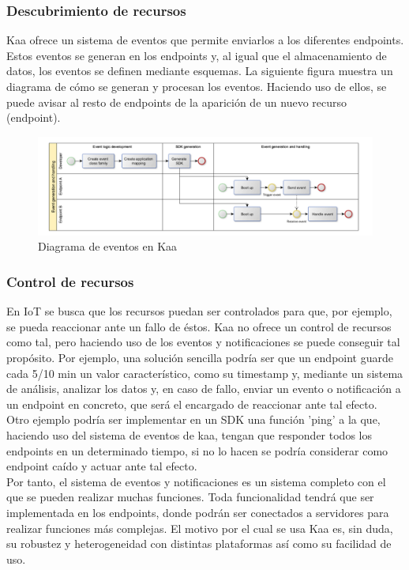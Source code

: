 \documentclass[12pt, twoside]{book}
\begin{document}
\subsubsection*{Descubrimiento de recursos}
Kaa ofrece un sistema de eventos que permite enviarlos a los diferentes endpoints. Estos eventos se generan en los endpoints y, al igual que el almacenamiento de datos, los eventos se definen mediante esquemas. La siguiente figura muestra un diagrama de cómo se generan y procesan los eventos. Haciendo uso de ellos, se puede avisar al resto de endpoints de la aparición de un nuevo recurso (endpoint).
\begin{figure}[H]
\centering
\includegraphics[scale=0.5]{images/events_schema}
\caption{Diagrama de eventos en Kaa}\label{L506}
\end{figure} 


\subsubsection*{Control de recursos}
En IoT se busca que los recursos puedan ser controlados para que, por ejemplo, se pueda reaccionar ante un fallo de éstos. Kaa no ofrece un control de recursos como tal, pero haciendo uso de los eventos y notificaciones se puede conseguir tal propósito. Por ejemplo, una solución sencilla podría ser que un endpoint guarde cada 5/10 min un valor característico, como su timestamp y, mediante un sistema de análisis, analizar los datos y, en caso de fallo, enviar un evento o notificación a un endpoint en concreto, que será el encargado de reaccionar ante tal efecto.\\
Otro ejemplo podría ser implementar en un SDK una función 'ping' a la que, haciendo uso del sistema de eventos de kaa, tengan que responder todos los endpoints en un determinado tiempo, si no lo hacen se podría considerar como endpoint caído y actuar ante tal efecto.\\
Por tanto, el sistema de eventos y notificaciones es un sistema completo con el que se pueden realizar muchas funciones. Toda funcionalidad tendrá que ser implementada en los endpoints, donde podrán ser conectados a servidores para realizar funciones más complejas. El motivo por el cual se usa Kaa es, sin duda, su robustez y heterogeneidad con distintas plataformas así como su facilidad de uso. 
\end{document}
